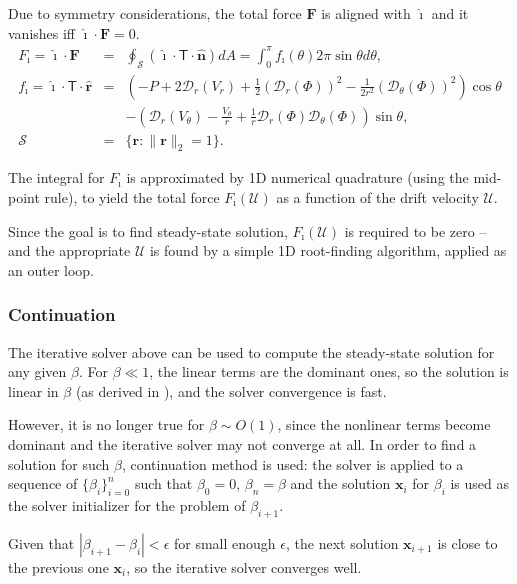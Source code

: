 \documentclass[final]{elsarticle}
\newcommand\eps \epsilon
\newcommand{\pars}[1]{\left(#1\right)}
\newcommand\bF{\boldsymbol{F}}
\newcommand\bx{\boldsymbol{x}}
\newcommand\br{\boldsymbol{r}}
\newcommand\brhat{\hat{\br}}
\newcommand\bnhat{\hat{\boldsymbol{n}}}
\newcommand\cD{\mathcal{D}}
\newcommand\cU{\mathscr{U}}
\newcommand\tT{\mathsf{T}}
\newcommand\ui{\boldsymbol{\hat{\imath}}}
\begin{document}
Due to symmetry considerations, the total force $\bF$ is 
aligned with $\ui$ and it vanishes iff $\ui \cdot \bF = 0$.
\begin{eqnarray*}
F_\imath = \ui \cdot \bF &=& 
\oint_\mathcal{S} \pars{\ui \cdot \tT \cdot \bnhat} dA = 
\int_0^\pi f_\imath(\theta) 2\pi \sin\theta d\theta ,
\\  
f_\imath = \ui \cdot \tT \cdot \brhat &=& \pars{-P + 2\cD_r(V_r) + 
\frac{1}{2}\pars{\cD_r(\varPhi)}^2 - \frac{1}{2r^2}\pars{\cD_\theta(\varPhi)}^2}\cos\theta 
\\  
&& -\pars{\cD_r(V_\theta) - \frac{V_\theta}{r}
+ \frac{1}{r}\cD_r(\varPhi) \cD_{\theta}(\varPhi)}\sin\theta, \\
 \mathcal{S} &=& \{\br : \|\br\|_2 = 1\}.
\end{eqnarray*}

The integral for $F_\imath$ is approximated by 1D numerical quadrature
(using the mid-point rule), to yield 
the total force $F_\imath(\cU)$ as a function of the drift velocity $\cU$.

Since the goal is to find steady-state solution, $F_\imath(\cU)$ 
is required to be zero --
and the appropriate $\cU$ is found by a simple 1D root-finding algorithm,
applied as an outer loop.

\subsubsection{Continuation}

The iterative solver above can be used to compute the steady-state solution for any given $\beta$.
For $\beta \ll 1$, the linear terms are the dominant ones, so the solution is linear in $\beta$ 
(as derived in \cite{yariv2010migration}), and the solver convergence is fast.

However, it is no longer true for $\beta \sim O(1)$, since the nonlinear terms become dominant
and the iterative solver may not converge at all.
In order to find a solution for such $\beta$, continuation method is used:
the solver is applied to a sequence of $\{\beta_i\}_{i=0}^n$ such that $\beta_0 = 0$,
$\beta_n = \beta$ and the solution $\bx_i$ for $\beta_i$ is used as the solver initializer
for the problem of $\beta_{i+1}$.

Given that $|\beta_{i+1} - \beta_i| < \eps$ for small enough $\eps$, 
the next solution $\bx_{i+1}$ is close to the previous one $\bx_i$,
so the iterative solver converges well.

\end{document}
